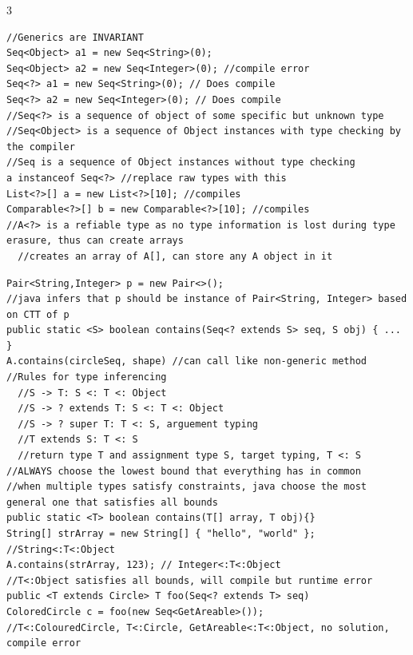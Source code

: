 \documentclass[10pt,a4paper]{article}
\begin{document}
\begin{multicols*}{3}
\begin{verbatim}
//Generics are INVARIANT
Seq<Object> a1 = new Seq<String>(0); 
Seq<Object> a2 = new Seq<Integer>(0); //compile error
Seq<?> a1 = new Seq<String>(0); // Does compile
Seq<?> a2 = new Seq<Integer>(0); // Does compile
//Seq<?> is a sequence of object of some specific but unknown type
//Seq<Object> is a sequence of Object instances with type checking by the compiler
//Seq is a sequence of Object instances without type checking
a instanceof Seq<?> //replace raw types with this
List<?>[] a = new List<?>[10]; //compiles
Comparable<?>[] b = new Comparable<?>[10]; //compiles
//A<?> is a refiable type as no type information is lost during type erasure, thus can create arrays
  //creates an array of A[], can store any A object in it
\end{verbatim}
\begin{verbatim}
Pair<String,Integer> p = new Pair<>();
//java infers that p should be instance of Pair<String, Integer> based on CTT of p
public static <S> boolean contains(Seq<? extends S> seq, S obj) { ... }
A.contains(circleSeq, shape) //can call like non-generic method
//Rules for type inferencing
  //S -> T: S <: T <: Object
  //S -> ? extends T: S <: T <: Object
  //S -> ? super T: T <: S, arguement typing
  //T extends S: T <: S
  //return type T and assignment type S, target typing, T <: S
//ALWAYS choose the lowest bound that everything has in common
//when multiple types satisfy constraints, java choose the most general one that satisfies all bounds
public static <T> boolean contains(T[] array, T obj){}
String[] strArray = new String[] { "hello", "world" }; //String<:T<:Object
A.contains(strArray, 123); // Integer<:T<:Object
//T<:Object satisfies all bounds, will compile but runtime error
public <T extends Circle> T foo(Seq<? extends T> seq)
ColoredCircle c = foo(new Seq<GetAreable>());
//T<:ColouredCircle, T<:Circle, GetAreable<:T<:Object, no solution, compile error
\end{verbatim}
\end{multicols*}
\end{document}
